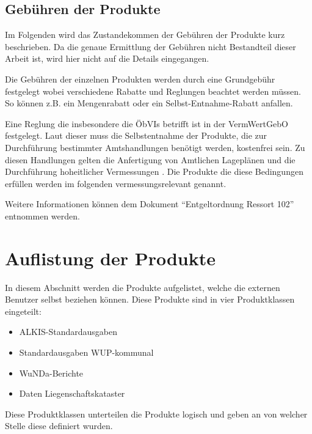 \subsection{Gebühren der Produkte}
Im Folgenden wird das Zustandekommen der Gebühren der Produkte kurz beschrieben. Da die genaue Ermittlung der Gebühren nicht Bestandteil dieser Arbeit ist, wird hier nicht auf die Details eingegangen. 

Die Gebühren der einzelnen Produkten werden durch eine Grundgebühr festgelegt wobei verschiedene Rabatte und Reglungen beachtet werden müssen. So können z.B. ein Mengenrabatt oder ein Selbst-Entnahme-Rabatt anfallen. 

Eine Reglung die insbesondere die \acp{ÖbVI} betrifft ist in der \ac{VermWertGebO} festgelegt. Laut dieser muss die Selbstentnahme der Produkte, die zur Durchführung bestimmter Amtshandlungen benötigt werden, kostenfrei sein. Zu diesen Handlungen gelten die Anfertigung von Amtlichen Lageplänen und die Durchführung hoheitlicher Vermessungen \autocite[vgl.][]{wupp-wunda-oebvi}. Die Produkte die diese Bedingungen erfüllen werden im folgenden vermessungsrelevant genannt.

Weitere Informationen können dem Dokument "`Entgeltordnung Ressort 102"' \autocite{wupp-entgelt} entnommen werden.

\section{Auflistung der Produkte}
In diesem Abschnitt werden die Produkte aufgelistet, welche die externen Benutzer selbst beziehen können. Diese Produkte sind in vier Produktklassen eingeteilt:
\begin{itemize}
	\item ALKIS-Standardausgaben
	\item Standardausgaben WUP-kommunal
	\item WuNDa-Berichte
	\item Daten Liegenschaftskataster
\end{itemize}
Diese Produktklassen unterteilen die Produkte logisch und geben an von welcher Stelle diese definiert wurden. 

